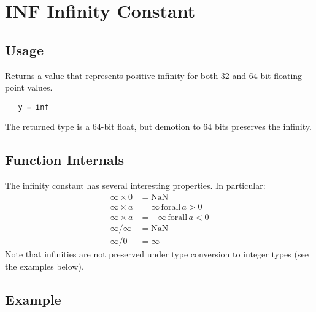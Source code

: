 \section{INF Infinity Constant}

\subsection{Usage}

Returns a value that represents positive infinity 
for both 32 and 64-bit floating point values.
\begin{verbatim}
   y = inf
\end{verbatim}
The returned type is a 64-bit float, but demotion to
64 bits preserves the infinity.
\subsection{Function Internals}

The infinity constant has
several interesting properties.  In particular:
\[
\begin{array}{ll}
   \infty \times 0 & = \mathrm{NaN} \\                                             \infty \times a & = \infty \, \mathrm{for all} \, a > 0 \\   \infty \times a & = -\infty \, \mathrm{for all} \, a < 0 \\   \infty / \infty & = \mathrm{NaN} \\   \infty / 0 & = \infty 
\end{array}
\]
Note that infinities are not preserved under type conversion to integer types (see the examples below).
\subsection{Example}

